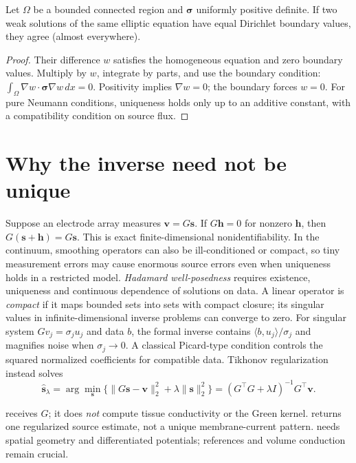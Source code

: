 \begin{proposition}
Let $\Omega$ be a bounded connected region and
$\boldsymbol\sigma$ uniformly positive definite. If two weak
solutions of the same elliptic equation have equal Dirichlet
boundary values, they agree (almost everywhere).
\end{proposition}
\begin{proof}
Their difference $w$ satisfies the homogeneous equation and
zero boundary values. Multiply by $w$, integrate by parts,
and use the boundary condition:
$\int_\Omega\nabla w\cdot\boldsymbol\sigma\nabla w\,dx=0$.
Positivity implies $\nabla w=0$; the boundary forces $w=0$.
For pure Neumann conditions, uniqueness holds only up to an
additive constant, with a compatibility condition on source flux.
\end{proof}

\section{Why the inverse need not be unique}
Suppose an electrode array measures $\mathbf v=G\mathbf s$.
If $G\mathbf h=0$ for nonzero $\mathbf h$, then
$G(\mathbf s+\mathbf h)=G\mathbf s$. This is exact
finite-dimensional nonidentifiability. In the continuum, smoothing
operators can also be ill-conditioned or compact, so tiny
measurement errors may cause enormous source errors even when
uniqueness holds in a restricted model.
\emph{Hadamard well-posedness} requires existence, uniqueness
and continuous dependence of solutions on data. A linear operator
is \emph{compact} if it maps bounded sets into sets with compact
closure; its singular values in infinite-dimensional inverse problems
can converge to zero.
For singular system $Gv_j=\sigma_j u_j$ and data $b$,
the formal inverse contains $\langle b,u_j\rangle/\sigma_j$
and magnifies noise when
$\sigma_j\to0$. A classical Picard-type condition controls the
squared normalized coefficients for compatible data.
Tikhonov regularization instead solves
\[
\widehat{\mathbf s}_\lambda
=\arg\min_{\mathbf s}
\{\|G\mathbf s-\mathbf v\|_2^2
 +\lambda\|\mathbf s\|_2^2\}
=(G^\top G+\lambda I)^{-1}G^\top\mathbf v.
\]
\begin{example}\sloppy
{} receives $G$;
it does \emph{not} compute tissue conductivity or the Green kernel.
returns one regularized source estimate, not a unique membrane-current
pattern.  needs
spatial geometry and differentiated potentials; references and
volume conduction remain crucial.
\end{example}
